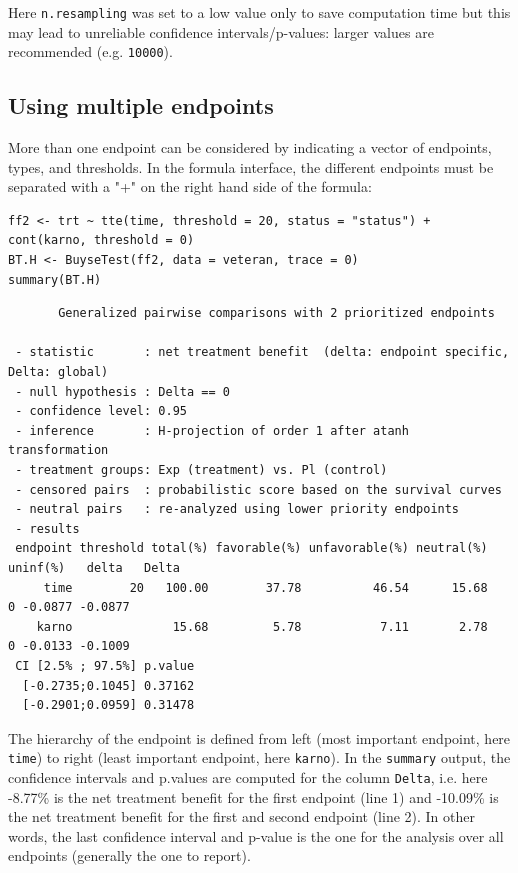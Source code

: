 \documentclass[12pt]{article}
\begin{document}
Here \texttt{n.resampling} was set to a low value only to save computation
time but this may lead to unreliable confidence intervals/p-values:
larger values are recommended (e.g. \texttt{10000}).



\subsection{Using multiple endpoints}
\label{sec:org106021b}

More than one endpoint can be considered by indicating a vector of
endpoints, types, and thresholds. In the formula interface, the
different endpoints must be separated with a "+" on the right hand
side of the formula:
\lstset{language=r,label= ,caption= ,captionpos=b,numbers=none}
\begin{lstlisting}
ff2 <- trt ~ tte(time, threshold = 20, status = "status") + cont(karno, threshold = 0)
BT.H <- BuyseTest(ff2, data = veteran, trace = 0)
summary(BT.H)
\end{lstlisting}

\begin{verbatim}
       Generalized pairwise comparisons with 2 prioritized endpoints

 - statistic       : net treatment benefit  (delta: endpoint specific, Delta: global) 
 - null hypothesis : Delta == 0 
 - confidence level: 0.95 
 - inference       : H-projection of order 1 after atanh transformation 
 - treatment groups: Exp (treatment) vs. Pl (control) 
 - censored pairs  : probabilistic score based on the survival curves
 - neutral pairs   : re-analyzed using lower priority endpoints
 - results
 endpoint threshold total(%) favorable(%) unfavorable(%) neutral(%) uninf(%)   delta   Delta
     time        20   100.00        37.78          46.54      15.68        0 -0.0877 -0.0877
    karno              15.68         5.78           7.11       2.78        0 -0.0133 -0.1009
 CI [2.5% ; 97.5%] p.value 
  [-0.2735;0.1045] 0.37162 
  [-0.2901;0.0959] 0.31478
\end{verbatim}

The hierarchy of the endpoint is defined from left (most important
endpoint, here \texttt{time}) to right (least important endpoint, here
\texttt{karno}). In the \texttt{summary} output, the confidence intervals and
p.values are computed for the column \texttt{Delta}, i.e. here -8.77\% is the
net treatment benefit for the first endpoint (line 1) and -10.09\% is the net
treatment benefit for the first and second endpoint (line 2). In other words,
the last confidence interval and p-value is the one for the analysis
over all endpoints (generally the one to report).
\end{document}
